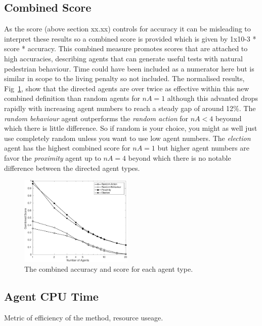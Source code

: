 \documentclass[letterpaper, 10 pt, journal, twoside]{IEEEtran}
\begin{document}
\subsection{Combined Score}
As the score (above section xx.xx) controls for accuracy it can be misleading to interpret these results so a combined score is provided which is given by 1x10-3 * score * accuracy. This combined measure promotes scores that are attached to high accuracies, describing agents that can generate useful tests with natural pedestrian behaviour. Time could have been included as a numerator here but is similar in scope to the living penalty so not included.%
%
The normalised results, Fig~\ref{Combined}, show that the directed agents are over twice as effective within this new combined definition than random agents for $nA=1$ although this advanted drops rapidly with increasing agent numbers to reach a steady gap of around 12\%.
%
The \textit{random behaviour} agent outperforms the \textit{random action} for $nA<4$ beyound which there is little difference. So if random is your choice, you might as well just use completely random unless you want to use low agent numbers. %
%
The \textit{election} agent has the highest combined score for $nA=1$ but higher agent numbers are favor the \textit{proximity} agent up to $nA=4$ beyond which there is no notable difference between the directed agent types. %
%

\begin{figure}[!t]
	\centering
\includegraphics[width=0.48\textwidth]{Combined.pdf}
	\caption{The combined accuracy and score for each agent type.}
	\label{Combined}
\end{figure}



\subsection{Agent CPU Time}
Metric of efficiency of the method, resource useage.
\end{document}
